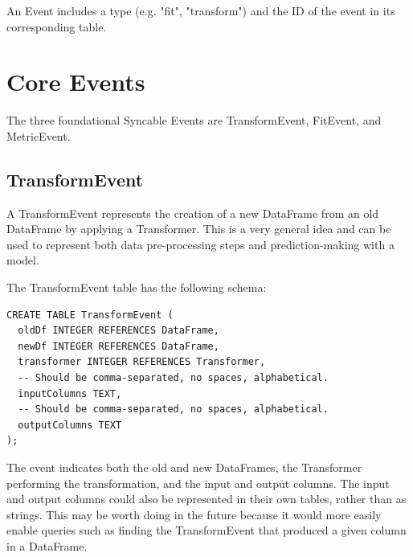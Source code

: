 An Event includes a type (e.g. "fit", "transform") and the ID of the event
in its corresponding table.

\section{Core Events}
The three foundational Syncable Events are TransformEvent, FitEvent, and MetricEvent.

\subsection{TransformEvent}
A TransformEvent represents the creation of a new DataFrame from an old DataFrame by
applying a Transformer. This is a very general idea and can be used to represent both
data pre-processing steps and prediction-making with a model.

The TransformEvent table has the following schema:

\begin{verbatim}
CREATE TABLE TransformEvent (
  oldDf INTEGER REFERENCES DataFrame,
  newDf INTEGER REFERENCES DataFrame,
  transformer INTEGER REFERENCES Transformer,
  -- Should be comma-separated, no spaces, alphabetical.
  inputColumns TEXT, 
  -- Should be comma-separated, no spaces, alphabetical.
  outputColumns TEXT 
);
\end{verbatim}

The event indicates both the old and new DataFrames, the Transformer performing
the transformation, and the input and output columns. The input and output columns
could also be represented in their own tables, rather than as strings. This may
be worth doing in the future because it would more easily enable queries such as
finding the TransformEvent that produced a given column in a DataFrame.


